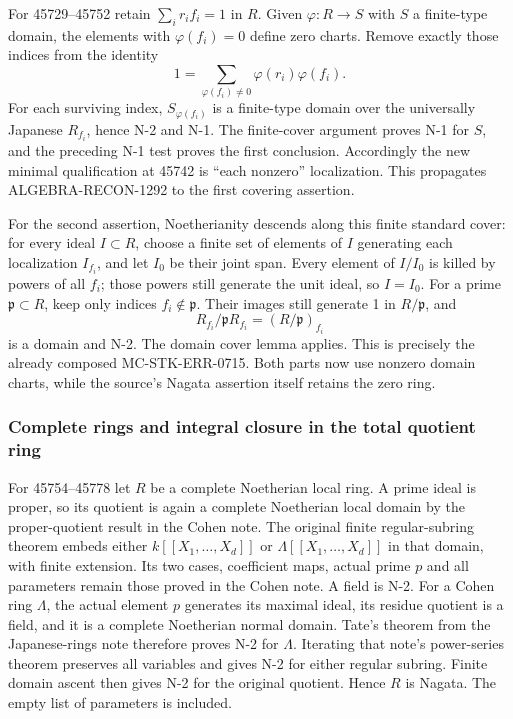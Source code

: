 For 45729--45752 retain \(\sum_i r_i f_i=1\) in \(R\). Given \(\varphi:R\to S\) with \(S\) a finite-type domain, the elements with \(\varphi(f_i)=0\) define zero charts. Remove exactly those indices from the identity \[
 1=\sum_{\varphi(f_i)\ne0}\varphi(r_i)\varphi(f_i).
\] For each surviving index, \(S_{\varphi(f_i)}\) is a finite-type domain over the universally Japanese \(R_{f_i}\), hence N-2 and N-1. The finite-cover argument proves N-1 for \(S\), and the preceding N-1 test proves the first conclusion. Accordingly the new minimal qualification at 45742 is ``each nonzero'' localization. This propagates ALGEBRA-RECON-1292 to the first covering assertion.

For the second assertion, Noetherianity descends along this finite standard cover: for every ideal \(I\subset R\), choose a finite set of elements of \(I\) generating each localization \(I_{f_i}\), and let \(I_0\) be their joint span. Every element of \(I/I_0\) is killed by powers of all \(f_i\); those powers still generate the unit ideal, so \(I=I_0\). For a prime \(\mathfrak p\subset R\), keep only indices \(f_i\notin\mathfrak p\). Their images still generate 1 in \(R/\mathfrak p\), and \[
 R_{f_i}/\mathfrak pR_{f_i}=(R/\mathfrak p)_{f_i}
\] is a domain and N-2. The domain cover lemma applies. This is precisely the already composed MC-STK-ERR-0715. Both parts now use nonzero domain charts, while the source's Nagata assertion itself retains the zero ring.

\subsubsection{Complete rings and integral closure in the total quotient ring}\label{complete-rings-and-integral-closure-in-the-total-quotient-ring}

For 45754--45778 let \(R\) be a complete Noetherian local ring. A prime ideal is proper, so its quotient is again a complete Noetherian local domain by the proper-quotient result in the Cohen note. The original finite regular-subring theorem embeds either \(k[[X_1,\ldots,X_d]]\) or \(\Lambda[[X_1,\ldots,X_d]]\) in that domain, with finite extension. Its two cases, coefficient maps, actual prime \(p\) and all parameters remain those proved in the Cohen note. A field is N-2. For a Cohen ring \(\Lambda\), the actual element \(p\) generates its maximal ideal, its residue quotient is a field, and it is a complete Noetherian normal domain. Tate's theorem from the Japanese-rings note therefore proves N-2 for \(\Lambda\). Iterating that note's power-series theorem preserves all variables and gives N-2 for either regular subring. Finite domain ascent then gives N-2 for the original quotient. Hence \(R\) is Nagata. The empty list of parameters is included.

